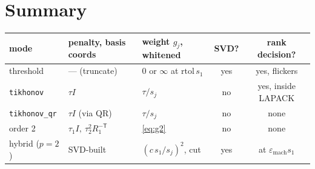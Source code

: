 \documentclass[11pt]{article}
\theoremstyle{definition}
\theoremstyle{remark}
\newcommand{\code}[1]{\texttt{#1}}
\newcommand{\eps}{\varepsilon_{\mathrm{mach}}}
\begin{document}
\section*{Summary}
\begin{center}
\renewcommand{\arraystretch}{1.25}
\begin{tabular}{@{}l>{\raggedright\arraybackslash}p{3.1cm}>{\raggedright\arraybackslash}p{3.2cm}cc@{}}
\toprule
mode & penalty, basis coords & weight $g_j$, whitened & SVD? & rank decision?\\
\midrule
threshold & --- (truncate) & $0$ or $\infty$ at $\mathrm{rtol}\,s_1$ & yes & yes, flickers\\
\code{tikhonov} & $\tau I$ & $\tau/s_j$ & no & yes, inside LAPACK\\
\code{tikhonov\_qr} & $\tau I$ (via QR) & $\tau/s_j$ & no & none\\
order 2 & $\tau_1 I,\ \tau_2^2R_1^{-\mathsf T}$ & \eqref{eq:g2} & no & none\\
hybrid ($p=2$) & SVD-built & $(c\,s_1/s_j)^2$, cut & yes & at $\eps s_1$\\
\bottomrule
\end{tabular}
\end{center}
\end{document}
